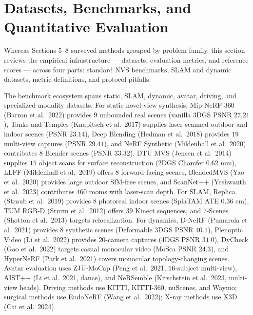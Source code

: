 \documentclass{article}
\begin{document}
\section{Datasets, Benchmarks, and Quantitative Evaluation}\label{datasets-benchmarks-and-quantitative-evaluation}

Whereas Sections 5--8 surveyed methods grouped by problem family, this section reviews the empirical infrastructure --- datasets, evaluation metrics, and reference scores --- across four parts: standard NVS benchmarks, SLAM and dynamic datasets, metric definitions, and protocol pitfalls.

The benchmark ecosystem spans static, SLAM, dynamic, avatar, driving, and specialized-modality datasets. For static novel-view synthesis, Mip-NeRF 360 (Barron et al.~2022) provides \(9\) unbounded real scenes (vanilla 3DGS PSNR \(27.21\)), Tanks and Temples (Knapitsch et al.~2017) supplies laser-scanned outdoor and indoor scenes (PSNR \(23.14\)), Deep Blending (Hedman et al.~2018) provides \(19\) multi-view captures (PSNR \(29.41\)), and NeRF Synthetic (Mildenhall et al.~2020) contributes \(8\) Blender scenes (PSNR \(33.32\)). DTU MVS (Jensen et al.~2014) supplies \(15\) object scans for surface reconstruction (2DGS Chamfer \(0.62\) mm), LLFF (Mildenhall et al.~2019) offers \(8\) forward-facing scenes, BlendedMVS (Yao et al.~2020) provides large outdoor SfM-free scenes, and ScanNet++ (Yeshwanth et al.~2023) contributes \(460\) rooms with laser-scan depth. For SLAM, Replica (Straub et al.~2019) provides \(8\) photoreal indoor scenes (SplaTAM ATE \(0.36\) cm), TUM RGB-D (Sturm et al.~2012) offers \(39\) Kinect sequences, and 7-Scenes (Shotton et al.~2013) targets relocalization. For dynamics, D-NeRF (Pumarola et al.~2021) provides \(8\) synthetic scenes (Deformable 3DGS PSNR \(40.1\)), Plenoptic Video (Li et al.~2022) provides \(20\)-camera captures (4DGS PSNR \(31.0\)), DyCheck (Gao et al.~2022) targets casual monocular video (MoSca PSNR \(24.3\)), and HyperNeRF (Park et al.~2021) covers monocular topology-changing scenes. Avatar evaluation uses ZJU-MoCap (Peng et al.~2021, \(16\)-subject multi-view), AIST++ (Li et al.~2021, dance), and NeRSemble (Kirschstein et al.~2023, multi-view heads). Driving methods use KITTI, KITTI-360, nuScenes, and Waymo; surgical methods use EndoNeRF (Wang et al.~2022); X-ray methods use X3D (Cai et al.~2024).
\end{document}
